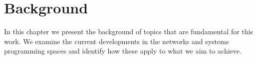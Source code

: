 \chapter{Background}

In this chapter we present the background of topics that are fundamental for this work.
We examine the current developments in the networks and systems programming spaces and identify how these apply to what we aim to achieve.



